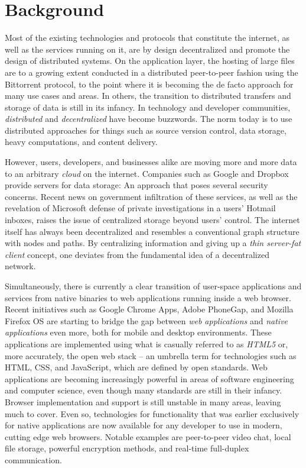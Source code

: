 \section{Background}

Most of the existing technologies and protocols that constitute the internet, as well as the services running on it, are by design decentralized and promote the design of distributed systems\cite{InternetDecenterlized:Online}. On the application layer, the hosting of large files are to a growing extent conducted in a distributed peer-to-peer fashion using the Bittorrent protocol, to the point where it is becoming the de facto approach for many use cases and areas. In others, the transition to distributed transfers and storage of data is still in its infancy. In technology and developer communities, \emph{distributed} and \emph{decentralized} have become buzzwords. The norm today is to use distributed approaches for things such as source version control, data storage, heavy computations, and content delivery.

However, users, developers, and businesses alike are moving more and more data to an arbitrary \emph{cloud} on the internet. Companies such as Google and Dropbox provide servers for data storage: An approach that poses several security concerns. Recent news on government infiltration of these services, as well as the revelation of Microsoft defense of private investigations in a users' Hotmail inboxes\cite{Frank:2014}, raises the issue of centralized storage beyond users' control. The internet itself has always been decentralized and resembles a conventional graph structure with nodes and paths. By centralizing information and giving up a \emph{thin server-fat client} concept, one deviates from the fundamental idea of a decentralized network.

Simultaneously, there is currently a clear transition of user-space applications and services from native binaries to web applications running inside a web browser. Recent initiatives such as Google Chrome Apps, Adobe PhoneGap, and Mozilla Firefox OS are starting to bridge the gap between \emph{web applications} and \emph{native applications} even more, both for mobile and desktop environments. These applications are implemented using what is casually referred to as \emph{HTML5} or, more accurately, the open web stack – an umbrella term for technologies such as HTML, CSS, and JavaScript, which are defined by open standards. Web applications are becoming increasingly powerful in areas of software engineering and computer science, even though many standards are still in their infancy. Browser implementation and support is still unstable in many areas, leaving much to cover. Even so, technologies for functionality that was earlier exclusively for native applications are now available for any developer to use in modern, cutting edge web browsers. Notable examples are peer-to-peer video chat, local file storage, powerful encryption methods, and real-time full-duplex communication.

